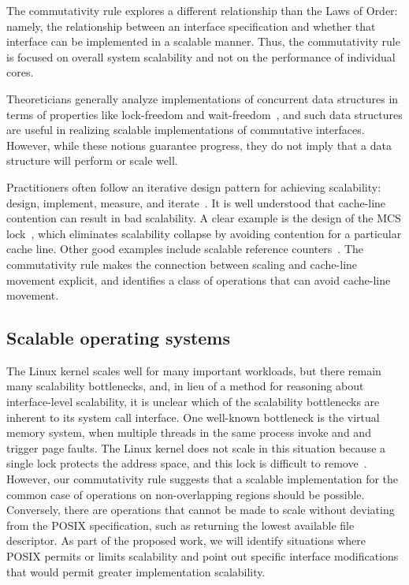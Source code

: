 The commutativity rule explores a different relationship
than the Laws of Order: namely, the relationship between an interface
specification and whether that interface can be implemented in a scalable
manner.  Thus, the commutativity rule is focused on overall system
scalability and not on the performance of individual cores.

Theoreticians generally analyze implementations of concurrent
data structures in terms of properties like lock-freedom and
wait-freedom~\cite{herlihy:art}, and such data structures are useful in
realizing scalable implementations of commutative interfaces.
However, while these notions guarantee progress, they do not imply that a data
structure will perform or scale well.


Practitioners often follow an iterative design pattern for
achieving scalability: design, implement, measure, and
iterate~\cite{cacm-real-world}.  It is well understood that cache-line
contention can result in bad scalability. A clear example is the design of
the MCS lock~\cite{MCS}, which eliminates scalability collapse by avoiding
contention for a particular cache line.  Other good examples include
scalable reference counters~\cite{approx:counter,snzi:podc}.
The commutativity rule makes the connection between scaling and cache-line
movement explicit, and identifies a class of operations that can avoid
cache-line movement.

\subsection{Scalable operating systems}

The Linux kernel scales well for many important workloads, but
there remain many scalability bottlenecks, and, in lieu of a method for
reasoning about interface-level scalability, it is unclear which
of the scalability bottlenecks are inherent to its system call interface.
One well-known bottleneck is the virtual memory system, when multiple
threads in the same process invoke  and  and
trigger page faults.  The Linux kernel does not scale in this situation
because a single lock protects the address space, and this lock is difficult
to remove~\cite{clements:bonsai}.  However, our commutativity rule suggests
that a scalable implementation for the common case of operations on
non-overlapping regions should be possible.  Conversely, there are
operations that cannot be made to scale without deviating from the POSIX
specification,
such as  returning the lowest available file descriptor.
As part of the proposed work, we will identify situations where POSIX permits or
limits scalability and point out specific interface modifications that would
permit greater implementation scalability.

